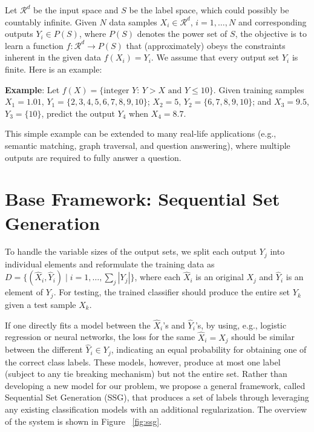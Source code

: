 \documentclass[letterpaper]{article}
\begin{document}
Let $\mathcal{R}^d$ be the input space and $S$ be the label space, which could possibly be countably infinite. Given $N$ data samples $X_i \in \mathcal{R}^d$, $i = 1, \ldots, N$ and corresponding outputs $Y_i \in P(S)$, where $P(S)$ denotes the power set of $S$, the objective is to learn a function $f: \mathcal{R}^d \to P(S)$ that (approximately) obeys the constraints inherent in the given data $f(X_i)=Y_i$. We assume that every output set $Y_i$ is finite. Here is an example:

\textbf{Example}: Let $f(X)=\{ \text{integer } Y : \, Y > X \text{ and } Y \le 10\}$. Given training samples $X_1=1.01$, $Y_1=\{2,3,4,5,6,7,8,9,10\}$; $X_2=5$, $Y_2=\{6,7,8,9,10\}$; and $X_3=9.5$, $Y_3=\{10\}$, predict the output $Y_4$ when $X_4=8.7$.




This simple example can be extended to many real-life applications (e.g., semantic matching, graph traversal, and question answering), where multiple outputs are required to fully answer a question.

\section{Base Framework: Sequential Set Generation }
To handle the variable sizes of the output sets, we split each output $Y_j$ into individual elements and reformulate the training data as $D = \{(\hat{X}_i, \hat{Y}_i) \mid i=1, \ldots, \sum_j|Y_j|\}$, where each $\hat{X}_i$ is an original $X_j$ and $\hat{Y}_i$ is an element of $Y_j$. For testing, the trained classifier should produce the entire set $Y_k$ given a test sample $X_k$.


If one directly fits a model between the $\hat{X}_i$'s and $\hat{Y}_i$'s, by using, e.g., logistic regression or neural networks, the loss for the same $\hat{X}_i=X_j$ should be similar between the different $\hat{Y}_i \in Y_j$, indicating an equal probability for obtaining one of the correct class labels. These models, however, produce at most one label (subject to any tie breaking mechanism) but not the entire set. Rather than developing a new model for our problem, we propose a general framework, called Sequential Set Generation (SSG), that produces a set of labels through leveraging any existing classification models with an additional regularization. The overview of the system is shown in Figure ~\ref{fig:ssg}.
\end{document}
